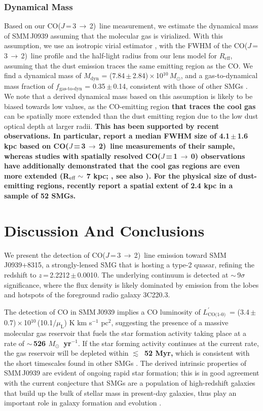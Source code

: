 \documentclass[iop, revtex4]{emulateapj}
\newcommand{\Msun}{\mbox{$M_{\odot}$}}
\newcommand{\rarr}{$\rightarrow$}
\newcommand{\CO}{\mbox{CO($J$\,=\,3\,$\rightarrow$\,2) }}
\newcommand{\rot}[3][CO]{\mbox{#1($J$\,=\,#2\,\rarr\,#3)}}
\newcommand{\Lp}{\mbox{$L^{\prime}_\textrm{CO(1-0)}$}}
\newcommand{\LpU}{\mbox{K\,\,km\,\,s$^{-1}$\,\,pc$^2$}}
\newcommand{\eg}{{\sl e.g.,~}}
\newcommand{\pmOne}{\mbox{$^{-1}$}}
\begin{document}
\subsubsection{Dynamical Mass}
Based on our \CO line measurement, we estimate the dynamical mass of SMM\,J0939 assuming that the molecular gas is virialized. With this assumption, we use an isotropic virial estimator \citep[\eg][]{Engel10a}, with the FWHM of the \CO line profile and the half-light radius from our lens model for $R_\textrm{eff}$, assuming that the dust emission traces the same emitting region as the CO. 
We find a dynamical mass of $M_\textrm{dyn}$ = (7.84\,$\pm$\,2.84)\,$\times$\,10$^{10}$\,\Msun, and a gas-to-dynamical mass fraction of $f_\textrm{gas-to-dyn}$ = 0.35\,$\pm$\,0.14, consistent with those of other SMGs \citep{Tacconi06a}.  We note that a derived dynamical mass based on this assumption is likely to be biased towards low values, as the CO-emitting region {\bf that traces the cool gas} can be spatially more extended than the dust emitting region due to the low dust optical depth at larger radii. %
{\bf This has been supported by recent observations. In particular, \citet{Tacconi06a} report a median FWHM size of 4.1\,$\pm$\,1.6 kpc based on \CO line measurements of their sample, whereas studies with spatially resolved \rot{1}{0} observations have additionally demonstrated that the cool gas regions are even more extended (R$_{\rm eff} \sim$ 7 kpc;  \citealt{Ivison11a}, see also \citealt{Riechers11c, Hodge13a}). 
For the physical size of dust-emitting regions, \citet{Simpson15a} recently report a spatial extent of 2.4 kpc in a sample of 52 SMGs.
 }

\section{Discussion And Conclusions}
We present the detection of \CO line emission toward SMM\,J0939+8315, a strongly-lensed SMG that is hosting a type-2 quasar, refining the redshift
to $z$\,=\,2.2212\,$\pm$\,0.0010. The underlying continuum is detected at $\sim$\,9$\sigma$ significance, where the flux density is likely dominated by emission from the lobes and hotspots of the foreground radio galaxy 3C220.3.

The detection of CO in SMM\,J0939
implies a CO luminosity of \Lp\ = (3.4\,$\pm$\,0.7)\,$\times$\,10$^{10}$\,(10.1/$\mu_\textrm{L}$) \LpU, suggesting the presence of a massive
molecular gas reservoir that fuels the star formation activity taking place at a rate of {\bf $\sim$\,526 \Msun~yr\pmOne}. If the star forming activity continues at the current rate, the gas reservoir will be depleted within {\bf $\lesssim$~52 Myr,}
which is consistent with the short timescales found in other SMGs \citep{Greve05a}. The derived intrinsic properties of SMM\,J0939 are evident of ongoing rapid star formation; this is in good agreement with the current conjecture that SMGs are a 
population of high-redshift galaxies that build up the bulk of stellar mass in present-day galaxies, thus play an important role
in galaxy formation and evolution \citep[\eg ][]{Dickinson03a}.
\end{document}
